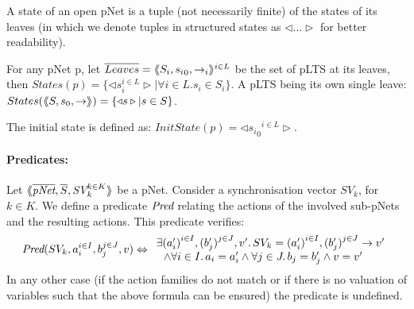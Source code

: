 \documentclass{lncs/llncs}
\newcommand{\Pred}{\symb{Pred}}
\begin{document}
%


\begin{definition}\label{def-states}
  A state of an open pNet is a tuple (not necessarily finite) of the
  states of its leaves (in which we denote tuples
  in structured states as $\triangleleft\ldots\triangleright$ for better readability).

  For any pNet p, let $\overline{Leaves} = \langle\hspace{-0.58ex}\langle S_i,{s_i}_0, \to_i\rangle\hspace{-0.58ex}\rangle^{i \in L}$ be the set of pLTS at its leaves,
  then $States(p) = \{\triangleleft s_i^{i\in L}
  \triangleright| \forall i\in L. s_i \in S_i\}$.
A pLTS being its own single leave:
  $States(\langle\hspace{-0.58ex}\langle S,s_0, \to\rangle\hspace{-0.58ex}\rangle) = \{\triangleleft s \triangleright| s \in S\}$.

The initial state is defined as:
$InitState(p) = \triangleleft {{s_i}_0}^{i\in L}  \triangleright$.
\end{definition}


\paragraph{Predicates:}
Let
$\mylangle\overline{\pNet},\overline{S},\symb{SV}_k^{k\in K} \myrangle$
be a pNet. Consider a synchronisation vector $SV_k$, for $k\in K$. We define a
predicate $\Pred$ relating
the actions of the involved sub-pNets and the resulting actions. This predicate verifies:
\[\Pred(SV_k, a_i^{i\in I}, b_j^{j\in J}, v)\Leftrightarrow
\begin{array}{l}
\exists {(a'_i)}^{i\in I},
{(b'_j)}^{j\in J},v'.\, SV_k={(a'_i)}^{i\in I}, {(b'_j)}^{j\in J}\rightarrow v'
\\~~\land
\forall i\in I.\, a_i=a'_i\land \forall j \in J.\, b_j=b'_j \land v=v'
\end{array}\]
In any other case (if the action families do not match or if there is no valuation of
variables such that the above formula can be ensured) the predicate is undefined.
\end{document}
